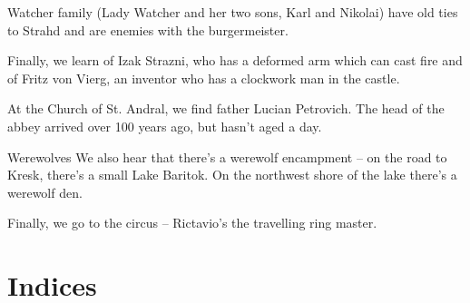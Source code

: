 \documentclass[10pt,twoside,twocolumn]{article}
\begin{document}
Watcher family (Lady Watcher and her two sons, Karl and Nikolai) have old ties to Strahd and are enemies with the burgermeister.

Finally, we learn of Izak Strazni, who has a deformed arm which can cast fire and of Fritz von Vierg, an inventor who has a clockwork man in the castle.

At the Church of St. Andral, we find father Lucian Petrovich. The head of the abbey arrived over 100 years ago, but hasn't aged a day.

\begin{paperbox}{Werewolves}
  We also hear that there's a werewolf encampment -- on the road to Kresk, there's a small Lake Baritok. On the northwest shore of the lake there's a werewolf den.
\end{paperbox}
Finally, we go to the circus -- Rictavio's the travelling ring master.
\clearpage
\section{Indices}
\end{document}
